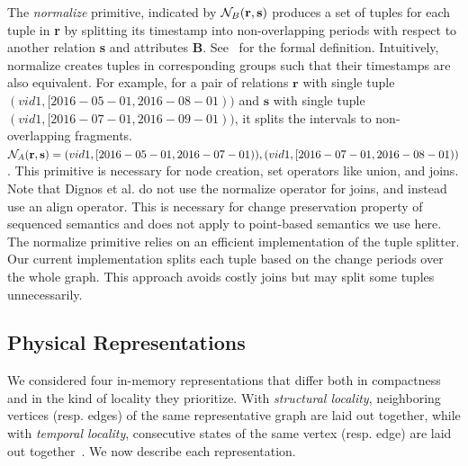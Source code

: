 The {\em normalize} primitive, indicated by $\mathcal{N}_{B}(\mathbf{r},\mathbf{s})$ produces
a set of tuples for each tuple in {\bf r} by splitting its timestamp
into non-overlapping periods with respect to another relation {\bf s}
and attributes {\bf B}.  See~\cite{Dignos2012} for the formal
definition.  Intuitively, normalize creates tuples in corresponding
groups such that their timestamps are also equivalent.  For example,
for a pair of relations $\mathbf{r}$ with single tuple $(vid1,
[2016-05-01, 2016-08-01))$ and $\mathbf{s}$ with single tuple $(vid1,
  [2016-07-01, 2016-09-01))$, it splits the intervals to
    non-overlapping fragments. $\mathcal{N}_{A}(\mathbf{r},\mathbf{s}) = (vid1, [2016-05-01,
      2016-07-01)),(vid1, [2016-07-01, 2016-08-01))$.  This primitive
        is necessary for node creation, set operators like union, and
        joins.  Note that Dignos et al. do not use the normalize
        operator for joins, and instead use an align operator.  This
        is necessary for change preservation property of sequenced
        semantics and does not apply to point-based semantics we use
        here.  The normalize primitive relies on an efficient
        implementation of the tuple splitter.  Our current
        implementation splits each tuple based on the change periods
        over the whole graph.  This approach avoids costly joins but
        may split some tuples unnecessarily.

\subsection{Physical Representations}
\label{sec:sys:datastructs}

We considered four in-memory \tg representations that differ both in
compactness and in the kind of locality they prioritize. With {\em
  structural locality}, neighboring vertices (resp. edges) of the same
representative graph are laid out together, while with {\em temporal
  locality}, consecutive states of the same vertex (resp. edge) are
laid out together~\cite{Miao2015}.  We now
describe each representation.


